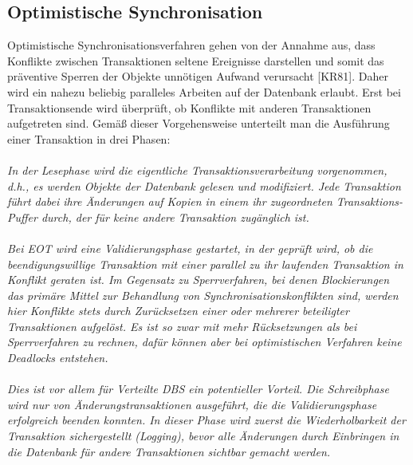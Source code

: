 \documentclass[letterpaper, 12pt]{article}
\let\tempsubsection\subsection
\renewcommand\subsection[1]{\vspace{0cm}\tempsubsection{#1}\vspace{0cm}}
\begin{document}
\subsection{Optimistische Synchronisation}
Optimistische Synchronisationsverfahren gehen von der Annahme aus, dass Konflikte zwischen Transaktionen seltene Ereignisse darstellen und somit das präventive Sperren der Objekte unnötigen Aufwand verursacht [KR81].  Daher wird ein nahezu beliebig paralleles Arbeiten auf der Datenbank erlaubt. Erst bei Transaktionsende wird überprüft, ob Konflikte mit anderen Transaktionen aufgetreten sind. Gemäß dieser Vorgehensweise unterteilt man die Ausführung einer Transaktion in drei Phasen:
\\\\
\emph{
In der Lesephase wird die eigentliche Transaktionsverarbeitung vorgenommen, d.h., es werden Objekte der Datenbank gelesen und modifiziert. Jede Transaktion führt dabei ihre Änderungen auf Kopien in einem ihr zugeordneten Transaktions-Puffer durch, der für keine andere Transaktion zugänglich ist.
\\\\
Bei EOT wird eine Validierungsphase gestartet, in der geprüft wird, ob die beendigungswillige Transaktion mit einer parallel zu ihr laufenden Transaktion in Konflikt geraten ist. Im Gegensatz zu Sperrverfahren, bei denen Blockierungen das primäre Mittel zur Behandlung von Synchronisationskonflikten sind, werden hier Konflikte stets durch Zurücksetzen einer oder mehrerer beteiligter Transaktionen aufgelöst. Es ist so zwar mit mehr Rücksetzungen als bei Sperrverfahren zu rechnen, dafür können aber bei optimistischen Verfahren keine Deadlocks entstehen.
\\\\
 Dies ist vor allem für Verteilte DBS ein potentieller Vorteil.
Die Schreibphase wird nur von Änderungstransaktionen ausgeführt, die die Validierungsphase erfolgreich beenden konnten. In dieser Phase wird zuerst die Wiederholbarkeit der Transaktion sichergestellt (Logging), bevor alle Änderungen durch Einbringen in die Datenbank für andere Transaktionen sichtbar gemacht werden. 
}
\end{document}
